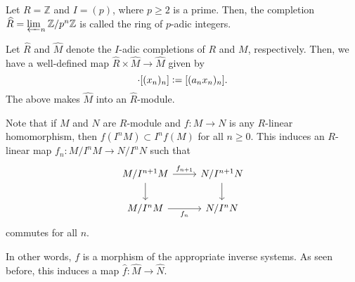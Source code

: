 \begin{ex}
	Let $R = \mathbb{Z}$ and $I = (p)$, where $p \ge 2$ is a prime. Then, the completion $\widehat{R} = \varprojlim_{n} \mathbb{Z}/p^{n} \mathbb{Z}$ is called the ring of $p$-adic integers.
\end{ex}

Let $\widehat{R}$ and $\widehat{M}$ denote the $I$-adic completions of $R$ and $M$, respectively. Then, we have a well-defined map $\widehat{R} \times \widehat{M} \to \widehat{M}$ given by
\begin{equation*} 
	[(a_{n})_{n}] \cdot [(x_{n})_{n}] \vcentcolon= [(a_{n} x_{n})_{n}].
\end{equation*}
The above makes $\widehat{M}$ into an $\widehat{R}$-module.

Note that if $M$ and $N$ are $R$-module and $f : M \to N$ is any $R$-linear homomorphism, then $f(I^{n} M) \subset I^{n} f(M)$ for all $n \ge 0$. This induces an $R$-linear map $f_{n} : M/I^{n} M \to N/I^{n} N$ such that 
\begin{equation*} 
	\begin{tikzcd}
		M/I^{n + 1} M \arrow[r, "f_{n + 1}"] \arrow[d] & N/I^{n + 1} N \arrow[d] \\
		M/I^{n} M \arrow[r, "f_{n}"'] & N/I^{n} N
	\end{tikzcd}
\end{equation*} 
commutes for all $n$.

In other words, $f$ is a morphism of the appropriate inverse systems. As seen before, this induces a map $\widehat{f} : \widehat{M} \to \widehat{N}$. 

